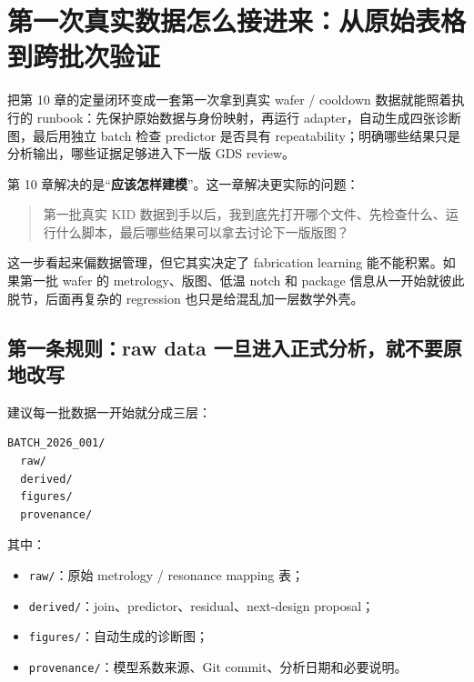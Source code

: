 \chapter{第一次真实数据怎么接进来：从原始表格到跨批次验证}

\begin{chaptergoal}
把第 10 章的定量闭环变成一套第一次拿到真实 wafer / cooldown 数据就能照着执行的 runbook：先保护原始数据与身份映射，再运行 adapter，自动生成四张诊断图，最后用独立 batch 检查 predictor 是否具有 repeatability；明确哪些结果只是分析输出，哪些证据足够进入下一版 GDS review。
\end{chaptergoal}

第 10 章解决的是“\textbf{应该怎样建模}”。这一章解决更实际的问题：

\begin{quote}
第一批真实 KID 数据到手以后，我到底先打开哪个文件、先检查什么、运行什么脚本，最后哪些结果可以拿去讨论下一版版图？
\end{quote}

这一步看起来偏数据管理，但它其实决定了 fabrication learning 能不能积累。如果第一批 wafer 的 metrology、版图、低温 notch 和 package 信息从一开始就彼此脱节，后面再复杂的 regression 也只是给混乱加一层数学外壳。


\section{第一条规则：raw data 一旦进入正式分析，就不要原地改写}

建议每一批数据一开始就分成三层：

\begin{verbatim}
BATCH_2026_001/
  raw/
  derived/
  figures/
  provenance/
\end{verbatim}

其中：

\begin{itemize}
  \item \texttt{raw/}：原始 metrology / resonance mapping 表；
  \item \texttt{derived/}：join、predictor、residual、next-design proposal；
  \item \texttt{figures/}：自动生成的诊断图；
  \item \texttt{provenance/}：模型系数来源、Git commit、分析日期和必要说明。
\end{itemize}

